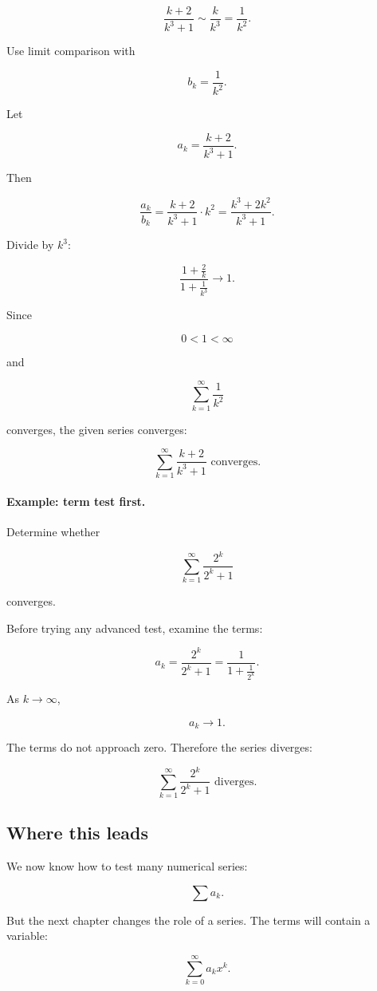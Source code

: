 \[
\frac{k+2}{k^3+1}
\sim
\frac{k}{k^3}
=
\frac1{k^2}.
\]

Use limit comparison with

\[
b_k=\frac1{k^2}.
\]

Let

\[
a_k=\frac{k+2}{k^3+1}.
\]

Then

\[
\frac{a_k}{b_k}
=
\frac{k+2}{k^3+1}\cdot k^2
=
\frac{k^3+2k^2}{k^3+1}.
\]

Divide by \(k^3\):

\[
\frac{1+\frac2k}{1+\frac1{k^3}}\to1.
\]

Since

\[
0<1<\infty
\]

and

\[
\sum_{k=1}^{\infty}\frac1{k^2}
\]

converges, the given series converges:

\[
\boxed{
\sum_{k=1}^{\infty}\frac{k+2}{k^3+1}
\text{ converges.}
}
\]

\paragraph{Example: term test first.}
Determine whether

\[
\sum_{k=1}^{\infty}\frac{2^k}{2^k+1}
\]

converges.

Before trying any advanced test, examine the terms:

\[
a_k=\frac{2^k}{2^k+1}
=
\frac{1}{1+\frac1{2^k}}.
\]

As \(k\to\infty\),

\[
a_k\to1.
\]

The terms do not approach zero.  Therefore the series diverges:

\[
\boxed{
\sum_{k=1}^{\infty}\frac{2^k}{2^k+1}
\text{ diverges.}
}
\]

\subsection{Where this leads}
\label{subsec:where-series-tests-lead}

We now know how to test many numerical series:

\[
\sum a_k.
\]

But the next chapter changes the role of a series.  The terms will contain a variable:

\[
\sum_{k=0}^{\infty}a_k x^k.
\]


